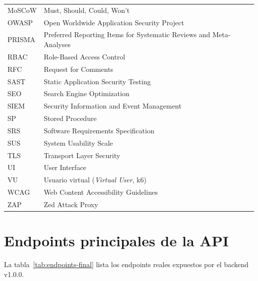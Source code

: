 \begin{longtable}{@{}p{2.3cm}p{12.3cm}@{}}
    MoSCoW & Must, Should, Could, Won't \\
    OWASP & Open Worldwide Application Security Project \\
    PRISMA & Preferred Reporting Items for Systematic Reviews and Meta-Analyses \\
    RBAC & Role-Based Access Control \\
    RFC & Request for Comments \\
    SAST & Static Application Security Testing \\
    SEO & Search Engine Optimization \\
    SIEM & Security Information and Event Management \\
    SP & Stored Procedure \\
    SRS & Software Requirements Specification \\
    SUS & System Usability Scale \\
    TLS & Transport Layer Security \\
    UI & User Interface \\
    VU & Usuario virtual (\emph{Virtual User}, k6) \\
    WCAG & Web Content Accessibility Guidelines \\
    ZAP & Zed Attack Proxy \\
\end{longtable}
\normalsize

\section{Endpoints principales de la API}

La tabla~\ref{tab:endpoints-final} lista los endpoints reales expuestos
por el backend v1.0.0.

